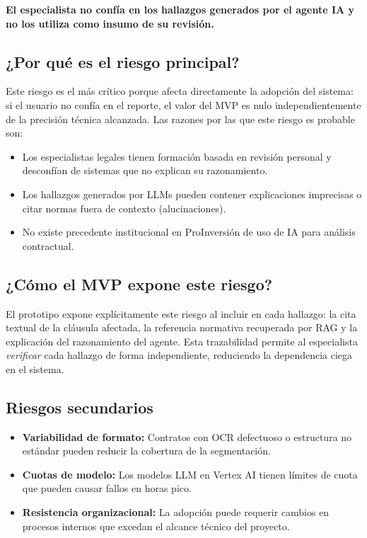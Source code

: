 \textbf{El especialista no confía en los hallazgos generados por el
agente IA y no los utiliza como insumo de su revisión.}

\subsection{¿Por qué es el riesgo principal?}

Este riesgo es el más crítico porque afecta directamente la adopción del
sistema: si el usuario no confía en el reporte, el valor del MVP es nulo
independientemente de la precisión técnica alcanzada. Las razones por las
que este riesgo es probable son:

\begin{itemize}
    \item Los especialistas legales tienen formación basada en revisión
    personal y desconfían de sistemas que no explican su razonamiento.
    \item Los hallazgos generados por LLMs pueden contener explicaciones
    imprecisas o citar normas fuera de contexto (alucinaciones).
    \item No existe precedente institucional en ProInversión de uso de
    IA para análisis contractual.
\end{itemize}

\subsection{¿Cómo el MVP expone este riesgo?}

El prototipo expone explícitamente este riesgo al incluir en cada hallazgo:
la cita textual de la cláusula afectada, la referencia normativa
recuperada por RAG y la explicación del razonamiento del agente. Esta
trazabilidad permite al especialista \textit{verificar} cada hallazgo
de forma independiente, reduciendo la dependencia ciega en el sistema.

\subsection{Riesgos secundarios}

\begin{itemize}
    \item \textbf{Variabilidad de formato:} Contratos con OCR defectuoso
    o estructura no estándar pueden reducir la cobertura de la segmentación.
    \item \textbf{Cuotas de modelo:} Los modelos LLM en Vertex AI tienen
    límites de cuota que pueden causar fallos en horas pico.
    \item \textbf{Resistencia organizacional:} La adopción puede requerir
    cambios en procesos internos que excedan el alcance técnico del proyecto.
\end{itemize}

